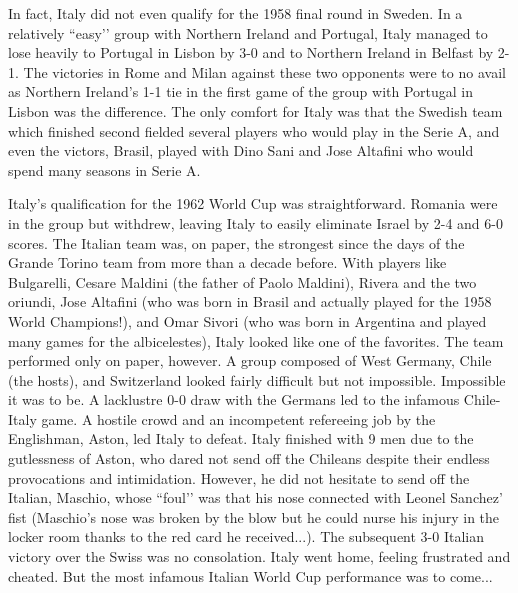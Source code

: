 In fact, Italy did not even qualify for the 1958 final round in Sweden. In a 
relatively ``easy’’ group with Northern Ireland and Portugal, Italy managed to 
lose heavily to Portugal in Lisbon by 3-0 and to Northern Ireland in Belfast by
2-1. The victories in Rome and Milan against these two opponents were to no 
avail as Northern Ireland's 1-1 tie in the first game of the group with 
Portugal in Lisbon was the difference. The only comfort for Italy was that the 
Swedish team which finished second fielded several players who would play in 
the Serie A, and even the victors, Brasil, played with Dino Sani and Jose 
Altafini who would spend many seasons in Serie A.

Italy's qualification for the 1962 World Cup was straightforward. Romania were 
in the group but withdrew, leaving Italy to easily eliminate Israel by 2-4 and 
6-0 scores. The Italian team was, on paper, the strongest since the days of the
Grande Torino team from more than a decade before. With players like Bulgarelli, 
Cesare Maldini (the father of Paolo Maldini), Rivera and the two oriundi, Jose 
Altafini (who was born in Brasil and actually played for the 1958 World 
Champions!), and Omar Sivori (who was born in Argentina and played many games 
for the albicelestes), Italy looked like one of the favorites. The team 
performed only on paper, however. A group composed of West Germany, Chile (the 
hosts), and Switzerland looked fairly difficult but not impossible. Impossible 
it was to be. A lacklustre 0-0 draw with the Germans led to the infamous Chile-
Italy game. A hostile crowd and an incompetent refereeing job by the Englishman,
Aston, led Italy to defeat. Italy finished with 9 men due to the gutlessness of 
Aston, who dared not send off the Chileans despite their endless provocations 
and intimidation. However, he did not hesitate to send off the Italian, Maschio,
whose ``foul’’ was that his nose connected with Leonel Sanchez' fist (Maschio's 
nose was broken by the blow but he could nurse his injury in the locker room 
thanks to the red card he received...). The subsequent 3-0 Italian victory over
the Swiss was no consolation. Italy went home, feeling frustrated and cheated.
But the most infamous Italian World Cup performance was to come...

